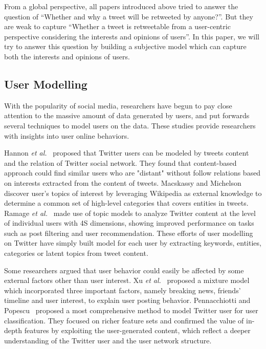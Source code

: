 \documentclass{acm_proc_article-sp}
\begin{document}
From a global perspective, all papers introduced above tried to answer the question of ``Whether and why a tweet will be retweeted by anyone?''. 
But they are weak to capture ``Whether a tweet is retweetable from a user-centric perspective considering the interests and opinions of users''. 
In this paper, we will try to answer this question by building a subjective model which can capture both the interests and opinions of users.

\subsection{User Modelling}
With the popularity of social media, researchers have begun to pay close attention to the massive amount of data generated by users, and put forwards several techniques to model users on the data. These studies provide researchers with insights into user online behaviors. 

Hannon \emph{et al.}~\cite{hannon2010recommending} proposed that Twitter users can be modeled by tweets content and the relation of Twitter social network.
They found that content-based approach could find similar users who are "distant" without follow relations based on interests extracted from the content of tweets. 
Macskassy and Michelson~\cite{macskassy2011people} discover user's topics of interest by leveraging Wikipedia as external knowledge to determine a common set of high-level categories that covers entities in tweets. 
Ramage \emph{et al.}~\cite{ramage10microblogs} made use of topic models to analyze Twitter content at the level of individual users with 4S dimensions, showing improved performance on tasks such as post filtering and user recommendation. 
These efforts of user modelling on Twitter have simply built model for each user by extracting keywords, entities, categories or latent topics from tweet content. 

Some researchers argued that user behavior could easily be affected by some external factors other than user interest.
Xu \emph{et al.}~\cite{xu2012modeling} proposed a mixture model which incorporated three important factors, namely breaking news, friends' timeline and user interest, to explain user posting behavior.
Pennacchiotti and Popescu~\cite{pennacchiotti2011machine} proposed a most comprehensive method to model Twitter user for user classification. They focused on richer feature sets and confirmed the value of in-depth features by exploiting the user-generated content, which reflect a deeper understanding of the Twitter user and the user network structure.
\end{document}
